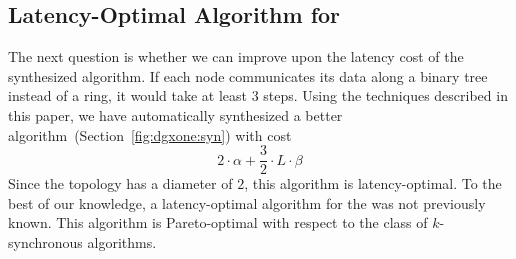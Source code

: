 \subsection{Latency-Optimal Algorithm for \dgxone}
The next question is whether we can improve upon the latency cost of
the synthesized algorithm. If each node communicates its data along a
binary tree instead of a ring, it would take at least $3$ steps. Using
the techniques described in this paper, we have automatically
synthesized a better algorithm~(Section~\ref{fig:dgxone:syn}) with
cost $$2\cdot \alpha + \frac{3}{2}\cdot L \cdot \beta$$ Since the
\dgxone topology has a diameter of $2$, this algorithm is
latency-optimal. To the best of our knowledge, a latency-optimal
algorithm for the \dgxone was not previously known. This algorithm is
Pareto-optimal with respect to the class of $k$-synchronous
algorithms.



